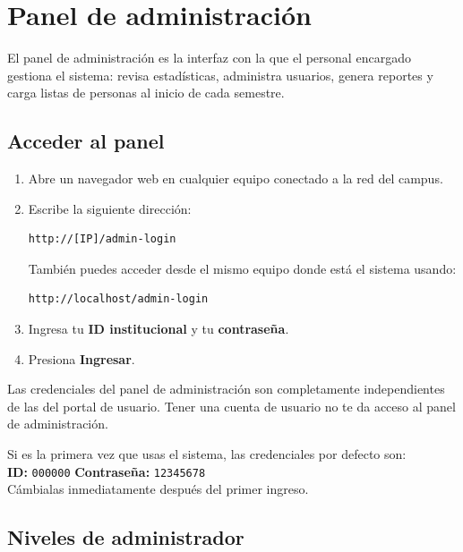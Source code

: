 \documentclass[12pt, a4paper]{article}
\begin{document}
\section{Panel de administración}
\label{sec:admin}

El panel de administración es la interfaz con la que el personal
encargado gestiona el sistema: revisa estadísticas, administra usuarios,
genera reportes y carga listas de personas al inicio de cada semestre.

\subsection{Acceder al panel}

\begin{enumerate}
  \item Abre un navegador web en cualquier equipo conectado a la red
        del campus.
  \item Escribe la siguiente dirección:
        \begin{lstlisting}
http://[IP]/admin-login
        \end{lstlisting}
        También puedes acceder desde el mismo equipo donde está el
        sistema usando:
        \begin{lstlisting}
http://localhost/admin-login
        \end{lstlisting}
  \item Ingresa tu \textbf{ID institucional} y tu \textbf{contraseña}.
  \item Presiona \textbf{Ingresar}.
\end{enumerate}

\begin{nota}
  Las credenciales del panel de administración son completamente
  independientes de las del portal de usuario. Tener una cuenta de
  usuario no te da acceso al panel de administración.
\end{nota}

\begin{aviso}
  Si es la primera vez que usas el sistema, las credenciales por
  defecto son:\\
  \textbf{ID:} \texttt{000000} \quad \textbf{Contraseña:} \texttt{12345678}\\
  Cámbialas inmediatamente después del primer ingreso.
\end{aviso}

\subsection{Niveles de administrador}
\end{document}
